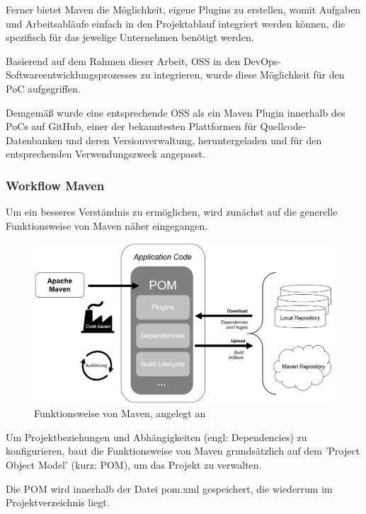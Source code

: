 Ferner bietet Maven die Möglichkeit, eigene Plugins zu erstellen, womit Aufgaben und Arbeitsabläufe einfach in den Projektablauf integriert werden können, die spezifisch für das jewelige Unternehmen benötigt werden. \cite[S. 3]{varanasi_introducing_2019}

Basierend auf dem Rahmen dieser Arbeit, OSS in den DevOps-Softwareentwicklungsprozesses zu integrieren, wurde diese Möglichkeit für den PoC aufgegriffen. 

Demgemäß wurde eine entsprechende OSS als ein Maven Plugin \cite{allberg_ayoyabayoy-maven-license-verifier-plugin_2021} innerhalb des PoCs auf GitHub, einer der bekanntesten Plattformen für Quellcode-Datenbanken und deren Versionverwaltung, heruntergeladen und für den entsprechenden Verwendungszweck angepasst.

\subsubsection{Workflow Maven}

Um ein besseres Verständnis zu ermöglichen, wird zunächst auf die generelle Funktionsweise von Maven näher eingegangen. 

\begin{figure}[h]
    \centering
    \includegraphics[scale=0.6]{Bilder/Workflow_Maven.png}
    \caption{Funktionsweise von Maven, angelegt an \cite{guntur_understanding_2020}}
\end{figure}

Um Projektbeziehungen und Abhängigkeiten (engl: Dependencies) zu konfigurieren, baut die Funktionsweise von Maven grundsätzlich auf dem 'Project Object Model' (kurz: POM), um das Projekt zu verwalten.

Die POM wird innerhalb der Datei pom.xml gespeichert, die wiederrum im Projektverzeichnis liegt. 

